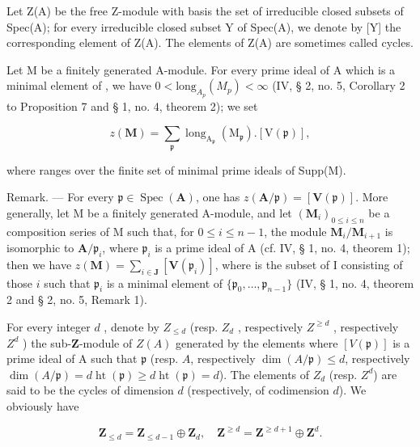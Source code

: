 {}{}Let Z(A) be the free Z-module with basis the set of irreducible closed subsets of Spec(A); for every irreducible closed subset Y of Spec(A), we denote by [Y] the corresponding element of Z(A). The elements of Z(A) are sometimes called cycles.

Let M be a finitely generated A-module. For every prime ideal  of A which is a minimal element of , we have \(0 < \text{long}_{A_{p}}(M_{p}) < \infty\) (IV, § 2, no. 5, Corollary 2 to Proposition 7 and § 1, no. 4, theorem 2); we set

\[
z (\mathbf {M}) = \sum_ {\mathfrak {p}} \operatorname{long} _ {\mathrm{A} _ {\mathfrak {p}}} (\mathrm{M} _ {\mathfrak {p}}). [ \mathrm{V} (\mathfrak {p}) ],
\]

where  ranges over the finite set of minimal prime ideals of Supp(M).

Remark. --- For every \(\mathfrak{p} \in \operatorname{Spec}(\mathbf{A})\), one has \(z(\mathbf{A}/\mathfrak{p}) = [\mathbf{V}(\mathfrak{p})]\). More generally, let M be a finitely generated A-module, and let \((\mathbf{M}_i)_{0 \leqslant i \leqslant n}\) be a composition series of M such that, for \(0 \leqslant i \leqslant n - 1\), the module \(\mathbf{M}_i / \mathbf{M}_{i+1}\) is isomorphic to \(\mathbf{A}/\mathfrak{p}_i\), where \(\mathfrak{p}_i\) is a prime ideal of A (cf. IV, § 1, no. 4, theorem 1); then we have \(z(\mathbf{M}) = \sum_{i \in \mathbf{J}} [\mathbf{V}(\mathfrak{p}_i)]\), where  is the subset of I consisting of those \(i\) such that \(\mathfrak{p}_i\) is a minimal element of \(\{\mathfrak{p}_0, \ldots, \mathfrak{p}_{n-1}\}\) (IV, § 1, no. 4, theorem 2 and § 2, no. 5, Remark 1).

For every integer \(d\) , denote by \(Z_{\leq d}\) (resp. \(Z_d\) , respectively \(Z^{\geq d}\) , respectively \(Z^d\) ) the sub-\(\mathbf{Z}\)-module of \(Z(A)\) generated by the elements  where \([V(\mathfrak{p})]\) is a prime ideal of A such that \(\mathfrak{p}\) (resp. \(A\), respectively \(\dim(A/\mathfrak{p}) \leqslant d\), respectively \(\dim(A/\mathfrak{p}) = d\)\(\operatorname{ht}(\mathfrak{p}) \geqslant d\)\(\operatorname{ht}(\mathfrak{p}) = d\)). The elements of \(Z_{d}\) (resp. \(Z^{d}\)) are said to be the cycles of dimension \(d\) (respectively, of codimension \(d\)). We obviously have

\[
\mathbf {Z} _ {\leqslant d} = \mathbf {Z} _ {\leqslant d - 1} \oplus \mathbf {Z} _ {d}, \quad \mathbf {Z} ^ {\geqslant d} = \mathbf {Z} ^ {\geqslant d + 1} \oplus \mathbf {Z} ^ {d}.
\]

